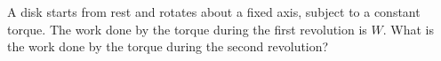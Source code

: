 A disk starts from rest and rotates about a fixed axis, subject to a
constant torque. The work done by the torque during the first
revolution is $W$. What is the work done by the torque during the
second revolution?\answercheck
